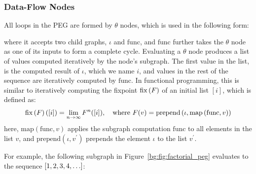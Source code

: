 \subsubsection{Data-Flow Nodes}

All loops in the PEG are formed by $\theta$ nodes, which is used in the
following form:
\begin{center}
    \vspace{-16.5pt}
    \vspace{-16.5pt}
\end{center}
where it accepts two child graphs, $\iota$ and $\mathrm{func}$, and
$\mathrm{func}$ further takes the $\theta$ node as one of its inputs to
form a complete cycle.  Evaluating a $\theta$ node produces a list of
values computed iteratively by the node's subgraph.  The first value in the
list, is the computed result of $\iota$, which we name $i$, and values in
the rest of the sequence are iteratively computed by $\mathrm{func}$.  In
functional programming, this is similar to iteratively computing the fixpoint
$\operatorname{\mathrm{fix}}\left({F}\right)$ of an initial list $[i]$, which is defined as:
\begin{equation}
    \operatorname{\mathrm{fix}}\left({F}\right) ([i]) = \lim_{n \to \infty} F^n ([i]),
    \quad\text{where~}
    F(v) = \mathrm{prepend}\left(
        \iota, \mathrm{map}\left( \mathrm{func}, v \right)
    \right)
\end{equation}
here, $\mathrm{map}(\mathrm{func}, v)$ applies the subgraph computation
$\mathrm{func}$ to all elements in the list $v$, and $\mathrm{prepend}(\iota,
v^\prime)$ prepends the element $\iota$ to the list $v^\prime$.

For example, the following subgraph in Figure~\ref{bg:fig:factorial_peg}
evaluates to the sequence $[1, 2, 3, 4, \mathellipsis]$:
\begin{center}
    \vspace{-16.5pt}
    \vspace{-16.5pt}
\end{center}

